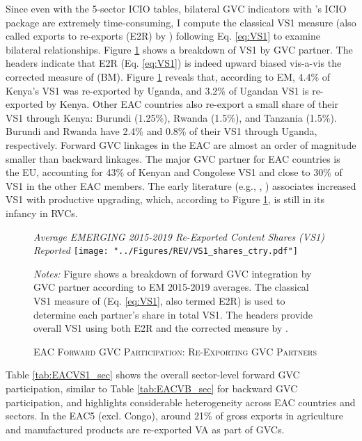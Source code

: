 \documentclass[a4paper]{article}
\begin{document}
Since even with the 5-sector ICIO tables, bilateral GVC indicators with \citet{belotti2020icio}'s ICIO package are extremely time-consuming, I compute the classical VS1 measure (also called exports to re-exports (E2R) by \citet{baldwin2015supply}) following Eq. \ref{eq:VS1} to examine bilateral relationships. Figure \ref{fig:EACVS1_ctry} shows a breakdown of VS1 by GVC partner. The headers indicate that E2R (Eq. \ref{eq:VS1}) is indeed upward biased vis-a-vis the corrected measure of \citet{borin2019measuring} (BM). Figure \ref{fig:EACVS1_ctry} reveals that, according to EM, 4.4\% of Kenya's VS1 was re-exported by Uganda, and 3.2\% of Ugandan VS1 is re-exported by Kenya. Other EAC countries also re-export a small share of their VS1 through Kenya: Burundi (1.25\%), Rwanda (1.5\%), and Tanzania (1.5\%). Burundi and Rwanda have 2.4\% and 0.8\% of their VS1 through Uganda, respectively. Forward GVC linkages in the EAC are almost an order of magnitude smaller than backward linkages. The major GVC partner for EAC countries is the EU, accounting for 43\% of Kenyan and Congolese VS1 and close to 30\% of VS1 in the other EAC members. The early literature (e.g., \citet{foster2015global}, \citet{Kummritz20161}) associates increased VS1 with productive upgrading, which, according to Figure \ref{fig:EACVS1_ctry}, is still in its infancy in RVCs.

\begin{figure}[h!]
\centering
\caption{\label{fig:EACVS1_ctry}\textsc{EAC Forward GVC Participation: Re-Exporting GVC Partners}}
\small{\textit{Average EMERGING 2015-2019 Re-Exported Content Shares (VS1) Reported}}
\vspace{2mm}
\texttt{[image: "../Figures/REV/VS1\_shares\_ctry.pdf"]} \\ \raggedright
\scriptsize
\vspace{-3mm}
\emph{Notes:} Figure shows a breakdown of forward GVC integration by GVC partner according to EM 2015-2019 averages. The classical VS1 measure of \citet{daudin2011produces} (Eq. \ref{eq:VS1}, also termed E2R) is used to determine each partner's share in total VS1. The headers provide overall VS1 using both E2R and the corrected measure by \citet{borin2019measuring}. 
\end{figure}
\FloatBarrier

Table \ref{tab:EACVS1_sec} shows the overall sector-level forward GVC participation, similar to Table \ref{tab:EACVB_sec} for backward GVC participation, and highlights considerable heterogeneity across EAC countries and sectors. In the EAC5 (excl. Congo), around 21\% of gross exports in agriculture and manufactured products are re-exported VA as part of GVCs. 
\end{document}
